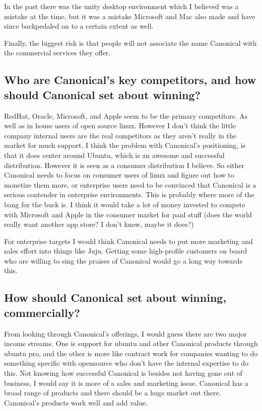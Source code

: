 \documentclass[letter,12pt]{article}
\begin{document}
In the past there was the unity desktop environment which I believed was a mistake at the time, but it was a mistake Microsoft and Mac also made and have since backpedaled on to a certain extent as well.

Finally, the biggest risk is that people will not associate the name Canonical with the commercial services they offer.

\subsection{Who are Canonical's key competitors, and how should Canonical set about winning?}
RedHat, Oracle, Microsoft, and Apple seem to be the primary competitors. As well as in house users of open source linux. However I don't think the little company internal users are the real competitors as they aren't really in the market for much support. I think the problem with Canonical's positioning, is that it does center around Ubuntu, which is an awesome and successful distribution. However it is seen as a consumer distribution I believe. So either Canonical needs to focus on consumer users of linux and figure out how to monetize them more, or enterprise users need to be convinced that Canonical is a serious contender in enterprise environments. This is probably where more of the bang for the buck is. I think it would take a lot of money invested to compete with Microsoft and Apple in the consumer market for paid stuff (does the world really want another app store? I don't know, maybe it does?)

For enterprise targets I would think Canonical needs to put more marketing and sales effort into things like Juju. Getting some high-profile customers on board who are willing to sing the praises of Canonical would go a long way towards this.

\subsection{How should Canonical set about winning, commercially?}
From looking through Canonical's offerings, I would guess there are two major income streams. One is support for ubuntu and other Canonical products through ubuntu pro, and the other is more like contract work for companies wanting to do something specific with opensource who don't have the internal expertise to do this. Not knowing how successful Canonical is besides not having gone out of business, I would say it is more of a sales and marketing issue. Canonical has a broad range of products and there should be a huge market out there. Canonical's products work well and add value.
\end{document}
